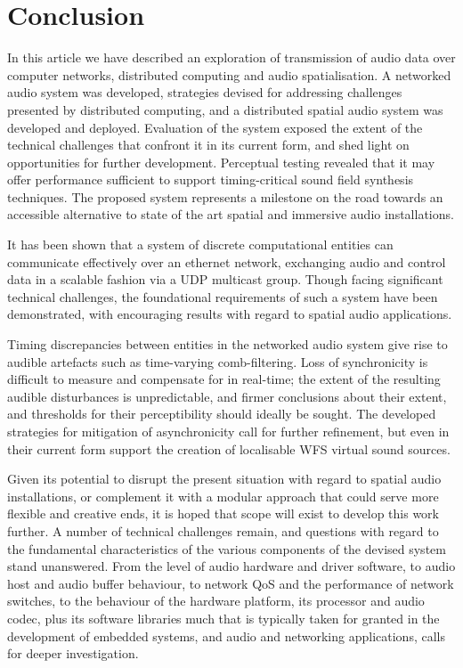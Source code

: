 \section{Conclusion}\label{sec:conclusion}

In this article we have described an exploration of transmission of audio data
over computer networks, distributed computing and audio spatialisation.
A networked audio system was developed, strategies devised for
addressing challenges presented by distributed computing, and a distributed
spatial audio system was developed and deployed.
Evaluation of the system exposed the extent of the technical challenges
that confront it in its current form, and shed light on opportunities for
further development.
Perceptual testing revealed that it may offer performance sufficient to support
timing-critical sound field synthesis techniques.
The proposed system represents a milestone on the road towards an accessible
alternative to state of the art spatial and immersive audio installations.

It has been shown that a system of discrete computational entities can
communicate effectively over an ethernet network, exchanging audio and control
data in a scalable fashion via a UDP multicast group.
Though facing significant technical challenges, the foundational requirements of
such a system have been demonstrated, with encouraging results with regard to
spatial audio applications.

Timing discrepancies between entities in the networked audio system give rise
to audible artefacts such as time-varying comb-filtering.
Loss of synchronicity is difficult to measure and compensate for in real-time;
the extent of the resulting audible disturbances is unpredictable, and firmer
conclusions about their extent, and thresholds for their perceptibility should
ideally be sought.
The developed strategies for mitigation of asynchronicity call for further
refinement, but even in their current form support the creation of localisable
WFS virtual sound sources.

Given its potential to disrupt the present situation with regard to spatial
audio installations, or complement it with a modular approach that could serve
more flexible and creative ends, it is hoped that scope will exist to develop
this work further.
A number of technical challenges remain, and questions with regard to the
fundamental characteristics of the various components of the devised system
stand unanswered.
From the level of audio hardware and driver software, to audio host and audio
buffer behaviour, to network QoS and the performance of network switches, to
the behaviour of the hardware platform, its processor and audio codec, plus its
software libraries \textemdash{} much that is typically taken for granted in the
development of embedded systems, and audio and networking applications, calls
for deeper investigation.


